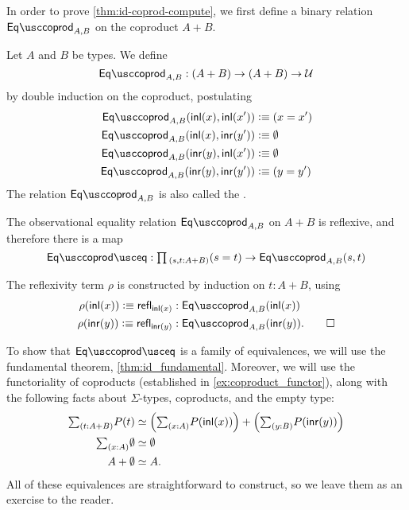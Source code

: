 In order to prove \cref{thm:id-coprod-compute}, we first define
a binary relation $\Eqcoprod_{A,B}$ on the coproduct $A+B$.

\begin{defn}
Let $A$ and $B$ be types. We define 
\begin{equation*}
\Eqcoprod_{A,B} : (A+B)\to (A+B)\to\UU
\end{equation*}
by double induction on the coproduct, postulating
\begin{align*}
\Eqcoprod_{A,B}(\inl(x),\inl(x')) & \defeq (x=x') \\
\Eqcoprod_{A,B}(\inl(x),\inr(y')) & \defeq \emptyt \\
\Eqcoprod_{A,B}(\inr(y),\inl(x')) & \defeq \emptyt \\
\Eqcoprod_{A,B}(\inr(y),\inr(y')) & \defeq (y=y')
\end{align*}
The relation $\Eqcoprod_{A,B}$ is also called the .
\end{defn}

\begin{lem}
The observational equality relation $\Eqcoprod_{A,B}$ on $A+B$ is reflexive, and therefore there is a map
\begin{equation*}
\Eqcoprodeq:\prd{s,t:A+B} (s=t)\to \Eqcoprod_{A,B}(s,t)
\end{equation*}
\end{lem}

\begin{constr}
The reflexivity term $\rho$ is constructed by induction on $t:A+B$, using
\begin{align*}
\rho(\inl(x))\defeq \refl{\inl(x)}  & : \Eqcoprod_{A,B}(\inl(x)) \\
\rho(\inr(y))\defeq \refl{\inr(y)} & : \Eqcoprod_{A,B}(\inr(y)).\qedhere
\end{align*}
\end{constr}

To show that $\Eqcoprodeq$ is a family of equivalences, we will use the fundamental theorem, \cref{thm:id_fundamental}. Moreover, we will use the functoriality of coproducts (established in \cref{ex:coproduct_functor}), along with the following facts about $\Sigma$-types, coproducts, and the empty type:
\begin{align*}
\sm{t:A+B}P(t) & \eqvsym \Big(\sm{x:A}P(\inl(x))\Big)+\Big(\sm{y:B}P(\inr(y))\Big)\\
\sm{x:A}\emptyt & \eqvsym \emptyt \\
A+\emptyt & \eqvsym A.
\end{align*}
All of these equivalences are straightforward to construct, so we leave them as an exercise to the reader. 

